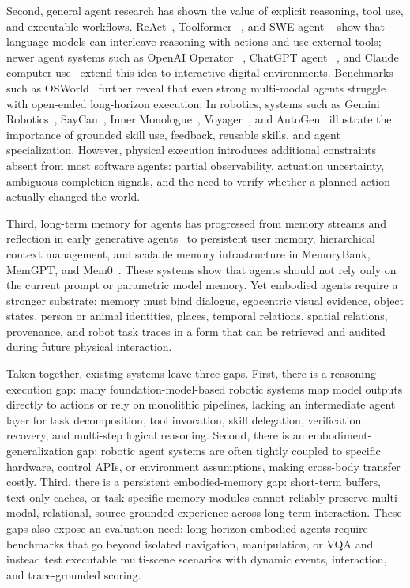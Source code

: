 Second, general agent research has shown the value of explicit reasoning, tool use, and executable workflows. ReAct~\cite{yao2022react}, Toolformer ~\cite{schick2023toolformer}, and SWE-agent ~\cite{yang2024sweagent} show that language models can interleave reasoning with actions and use external tools; newer agent systems such as OpenAI Operator ~\cite{openai2025operator}, ChatGPT agent ~\cite{openai2025chatgptagent}, and Claude computer use~\cite{anthropic2024computeruse} extend this idea to interactive digital environments. Benchmarks such as OSWorld~\cite{xie2024osworld} further reveal that even strong multi-modal agents struggle with open-ended long-horizon execution. In robotics, systems such as Gemini Robotics~\cite{deepmind2025geminirobotics}, SayCan~\cite{ahn2022saycan}, Inner Monologue~\cite{huang2022innermonologue}, Voyager~\cite{wang2023voyager}, and AutoGen~\cite{wu2023autogen} illustrate the importance of grounded skill use, feedback, reusable skills, and agent specialization. However, physical execution introduces additional constraints absent from most software agents: partial observability, actuation uncertainty, ambiguous completion signals, and the need to verify whether a planned action actually changed the world.


Third, long-term memory for agents has progressed from memory streams and reflection in early generative agents~\cite{generativeagents} to persistent user memory, hierarchical context management, and scalable memory infrastructure in MemoryBank, MemGPT, and Mem0~\cite{memorybank,packer2023memgpt,mem0}. These systems show that agents should not rely only on the current prompt or parametric model memory. Yet embodied agents require a stronger substrate: memory must bind dialogue, egocentric visual evidence, object states, person or animal identities, places, temporal relations, spatial relations, provenance, and robot task traces in a form that can be retrieved and audited during future physical interaction.

Taken together, existing systems leave three gaps. First, there is a reasoning-execution gap: many foundation-model-based robotic systems map model outputs directly to actions or rely on monolithic pipelines, lacking an intermediate agent layer for task decomposition, tool invocation, skill delegation, verification, recovery, and multi-step logical reasoning. Second, there is an embodiment-generalization gap: robotic agent systems are often tightly coupled to specific hardware, control APIs, or environment assumptions, making cross-body transfer costly. Third, there is a persistent embodied-memory gap: short-term buffers, text-only caches, or task-specific memory modules cannot reliably preserve multi-modal, relational, source-grounded experience across long-term interaction. These gaps also expose an evaluation need: long-horizon embodied agents require benchmarks that go beyond isolated navigation, manipulation, or VQA and instead test executable multi-scene scenarios with dynamic events, interaction, and trace-grounded scoring.



